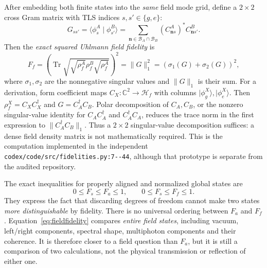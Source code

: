 \documentclass[11pt,a4paper]{article}
\newcommand{\ket}[1]{\lvert #1\rangle}
\newcommand{\braket}[2]{\langle #1\mid #2\rangle}
\newcommand{\code}[1]{\nolinkurl{#1}}
\newcommand{\Tr}{\operatorname{Tr}}
\newcommand{\HH}{\mathcal H}
\newcommand{\BB}{\mathcal B}
\begin{document}
After embedding both finite states into the \emph{same} field mode grid, define a $2\times2$ cross Gram matrix with TLS indices $s,s'\in\{g,e\}$:
\begin{equation}
 G_{ss'}=\braket{\phi_s^A}{\phi_{s'}^B}
 =\sum_{\mathbf n\in\BB_A\cap\BB_B}
 (C^A_{\mathbf n s})^*C^B_{\mathbf n s'}.
 \label{eq:gram}
\end{equation}
Then the \emph{exact squared Uhlmann field fidelity} is
\begin{equation}
 F_f=\left(\Tr\sqrt{\sqrt{\rho_f^A}\rho_f^B\sqrt{\rho_f^A}}\right)^2
 =\|G\|_1^2=(\sigma_1(G)+\sigma_2(G))^2,
 \label{eq:fieldfidelity}
\end{equation}
where $\sigma_1,\sigma_2$ are the nonnegative singular values and $\|G\|_1$ is their sum. For a derivation, form coefficient maps $C_X:\mathbb C^2\to\HH_f$ with columns $\ket{\phi_g^X},\ket{\phi_e^X}$. Then $\rho_f^X=C_XC_X^\dagger$ and $G=C_A^\dagger C_B$. Polar decomposition of $C_A,C_B$, or the nonzero singular-value identity for $C_A C_A^\dagger$ and $C_A^\dagger C_A$, reduces the trace norm in the first expression to $\|C_A^\dagger C_B\|_1$. Thus a $2\times2$ singular-value decomposition suffices: a dense field density matrix is not mathematically required. This is the computation implemented in the independent \code{codex/code/src/fidelities.py:7--44}, although that prototype is separate from the audited repository.

The exact inequalities for properly aligned and normalized global states are
\begin{equation}
 0\le F_s\le F_a\le1,\qquad 0\le F_s\le F_f\le1.
 \label{eq:monotone}
\end{equation}
They express the fact that discarding degrees of freedom cannot make two states \emph{more distinguishable} by fidelity. There is no universal ordering between $F_a$ and $F_f$. Equation~\eqref{eq:fieldfidelity} compares \emph{entire field states}, including vacuum, left/right components, spectral shape, multiphoton components and their coherence. It is therefore closer to a field question than $F_a$, but it is still a comparison of two calculations, not the physical transmission or reflection of either one.
\end{document}
